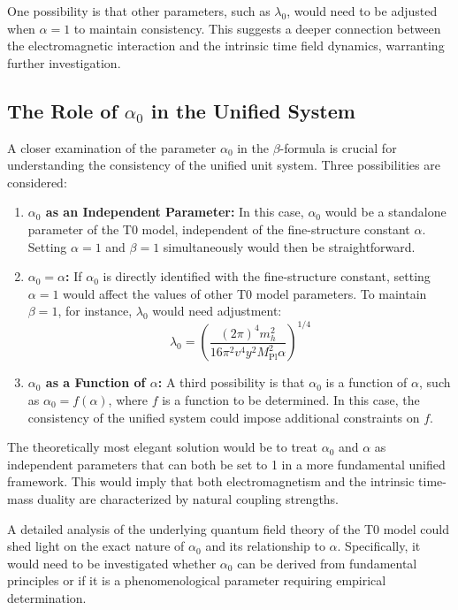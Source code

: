 \documentclass[12pt,a4paper]{article}
\newcommand{\Mpl}{M_{\text{Pl}}}
\begin{document}
	One possibility is that other parameters, such as \(\lambda_0\), would need to be adjusted when \(\alpha = 1\) to maintain consistency. This suggests a deeper connection between the electromagnetic interaction and the intrinsic time field dynamics, warranting further investigation.
	
	\subsection{The Role of \(\alpha_0\) in the Unified System}
	
	A closer examination of the parameter \(\alpha_0\) in the \(\beta\)-formula is crucial for understanding the consistency of the unified unit system. Three possibilities are considered:
	
	\begin{enumerate}
		\item \textbf{\(\alpha_0\) as an Independent Parameter:} In this case, \(\alpha_0\) would be a standalone parameter of the T0 model, independent of the fine-structure constant \(\alpha\). Setting \(\alpha = 1\) and \(\beta = 1\) simultaneously would then be straightforward.
		
		\item \textbf{\(\alpha_0 = \alpha\):} If \(\alpha_0\) is directly identified with the fine-structure constant, setting \(\alpha = 1\) would affect the values of other T0 model parameters. To maintain \(\beta = 1\), for instance, \(\lambda_0\) would need adjustment:
		\begin{equation}
			\lambda_0 = \left(\frac{(2\pi)^4 m_h^2}{16 \pi^2 v^4 y^2 \Mpl^2 \alpha}\right)^{1/4}
		\end{equation}
		
		\item \textbf{\(\alpha_0\) as a Function of \(\alpha\):} A third possibility is that \(\alpha_0\) is a function of \(\alpha\), such as \(\alpha_0 = f(\alpha)\), where \(f\) is a function to be determined. In this case, the consistency of the unified system could impose additional constraints on \(f\).
	\end{enumerate}
	
	The theoretically most elegant solution would be to treat \(\alpha_0\) and \(\alpha\) as independent parameters that can both be set to 1 in a more fundamental unified framework. This would imply that both electromagnetism and the intrinsic time-mass duality are characterized by natural coupling strengths.
	
	A detailed analysis of the underlying quantum field theory of the T0 model could shed light on the exact nature of \(\alpha_0\) and its relationship to \(\alpha\). Specifically, it would need to be investigated whether \(\alpha_0\) can be derived from fundamental principles or if it is a phenomenological parameter requiring empirical determination.
	
\end{document}
